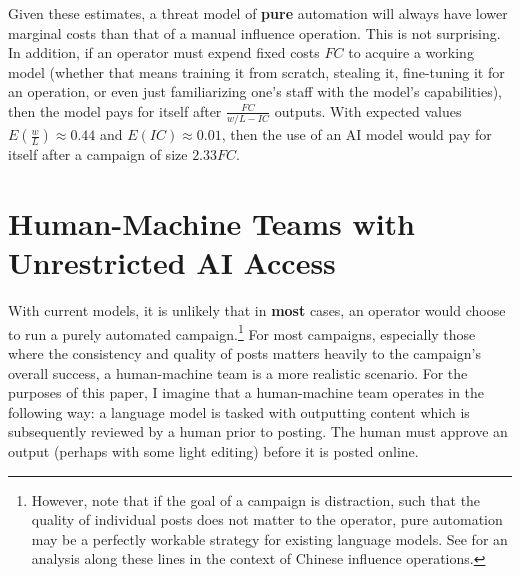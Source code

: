 \documentclass{article}
\begin{document}
Given these estimates, a threat model of \textbf{pure} automation will always have lower marginal costs than that of a manual influence operation. This is not surprising. In addition, if an operator must expend fixed costs $FC$ to acquire a working model (whether that means training it from scratch, stealing it, fine-tuning it for an operation, or even just familiarizing one's staff with the model's capabilities), then the model pays for itself after $\frac{FC}{w/L - IC}$ outputs. With expected values $E(\frac{w}{L}) \approx 0.44$ and $E(IC) \approx 0.01$, then the use of an AI model would pay for itself after a campaign of size $2.33 FC$.

\section{Human-Machine Teams with Unrestricted AI Access}
\label{sec:teams}

With current models, it is unlikely that in \textbf{most} cases, an operator would choose to run a purely automated campaign.\footnote{However, note that if the goal of a campaign is distraction, such that the quality of individual posts does not matter to the operator, pure automation may be a perfectly workable strategy for existing language models. See \cite{king} for an analysis along these lines in the context of Chinese influence operations.} For most campaigns, especially those where the consistency and quality of posts matters heavily to the campaign's overall success, a human-machine team is a more realistic scenario. For the purposes of this paper, I imagine that a human-machine team operates in the following way: a language model is tasked with outputting content which is subsequently reviewed by a human prior to posting. The human must approve an output (perhaps with some light editing) before it is posted online. 
\end{document}
